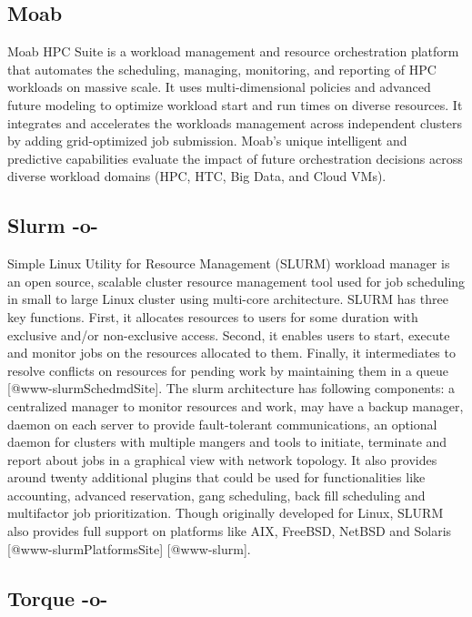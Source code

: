 \subsection{Moab}

Moab HPC Suite is a workload management and resource orchestration
platform that automates the scheduling, managing, monitoring, and
reporting of HPC workloads on massive scale. It uses multi-dimensional
policies and advanced future modeling to optimize workload start and
run times on diverse resources. It integrates and accelerates the
workloads management across independent clusters by adding
grid-optimized job submission. Moab's unique intelligent and
predictive capabilities evaluate the impact of future orchestration
decisions across diverse workload domains (HPC, HTC, Big Data, and
Cloud VMs)\cite{www-moab}.

\subsection{Slurm -o-}

Simple Linux Utility for Resource Management (SLURM) workload manager
is an open source, scalable cluster resource management tool used for
job scheduling in small to large Linux cluster using multi-core
architecture. SLURM has three key functions. First, it allocates
resources to users for some duration with exclusive and/or
non-exclusive access. Second, it enables users to start, execute and
monitor jobs on the resources allocated to them. Finally, it
intermediates to resolve conflicts on resources for pending work by
maintaining them in a queue [@www-slurmSchedmdSite]. The slurm
architecture has following components: a centralized manager to
monitor resources and work, may have a backup manager, daemon on each
server to provide fault-tolerant communications, an optional daemon
for clusters with multiple mangers and tools to initiate, terminate
and report about jobs in a graphical view with network topology. It
also provides around twenty additional plugins that could be used for
functionalities like accounting, advanced reservation, gang
scheduling, back fill scheduling and multifactor job
prioritization. Though originally developed for Linux, SLURM also
provides full support on platforms like AIX, FreeBSD, NetBSD and
Solaris [@www-slurmPlatformsSite] [@www-slurm].


     
\subsection{Torque -o-}




